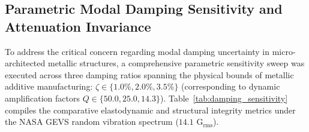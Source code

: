 \documentclass[preprint,12pt,3p]{elsarticle}
\begin{document}
\subsection{Parametric Modal Damping Sensitivity and Attenuation Invariance}
To address the critical concern regarding modal damping uncertainty in micro-architected metallic structures, a comprehensive parametric sensitivity sweep was executed across three damping ratios spanning the physical bounds of metallic additive manufacturing: $\zeta \in \{1.0\%, 2.0\%, 3.5\%\}$ (corresponding to dynamic amplification factors $Q \in \{50.0, 25.0, 14.3\}$). Table~\ref{tab:damping_sensitivity} compiles the comparative elastodynamic and structural integrity metrics under the NASA GEVS random vibration spectrum ($14.1\text{ G}_{\text{rms}}$).

\begin{table}[htb]
  \centering
  \caption{Parametric sensitivity analysis of modal structural damping ($\zeta$) under NASA GEVS random vibration qualification ($14.1\text{ G}_{\text{rms}}$).}
  \label{tab:damping_sensitivity}
  \small
  \footnotesize{}
\end{table}
\end{document}
